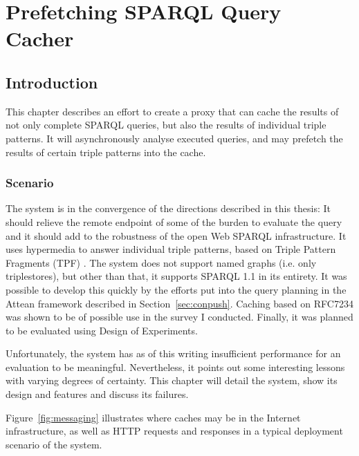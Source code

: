 
\chapter{Prefetching SPARQL Query Cacher}\label{sec:tpfcacheplanning}

\section{Introduction}

This chapter describes an effort to create a proxy that can cache the
results of not only complete SPARQL queries, but also the results of individual
triple patterns. It will asynchronously analyse executed queries, and
may prefetch the results of certain triple patterns into the cache.


\subsection{Scenario}

The system is in the convergence of the directions described in this
thesis: It should relieve the remote endpoint of some of the
burden to evaluate the query and it should add to the robustness of
the open Web SPARQL infrastructure. It uses hypermedia to answer
individual triple patterns, based on Triple Pattern Fragments (TPF)
\cite{ldf1}. The system does not support named graphs (i.e. only
triplestores), but other than that, it supports SPARQL 1.1 in its
entirety. It was possible to develop this quickly by the efforts put
into the query planning in the Attean framework described in
Section~\ref{sec:conpush}. Caching based on RFC7234 \cite{rfc7234} was
shown to be of possible use in the survey I conducted. Finally, it was
planned to be evaluated using Design of Experiments.

Unfortunately, the system has as of this writing insufficient
performance for an evaluation to be meaningful. Nevertheless, it
points out some interesting lessons with varying degrees of
certainty. This chapter will detail the system, show its design and
features and discuss its failures.

Figure~\ref{fig:messaging} illustrates where caches may be in the
Internet infrastructure, as well as HTTP requests and responses in a
typical deployment scenario of the system.

